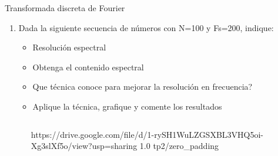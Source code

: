  \begin{frame}{Transformada discreta de Fourier}
    \begin{enumerate}
       \item{Dada la siguiente secuencia de números con N=100 y Fs=200, indique:}
    \begin{itemize}
       \item{Resolución espectral}
       \item{Obtenga el contenido espectral}
       \item{Que técnica conoce para mejorar la resolución en frecuencia?}
       \item{Aplique la técnica, grafique y comente los resultados}
    \end{itemize}

   \begin{columns}[c]
      \hspace{2pt}
      \begin{column}{.6\textwidth}
         
      \end{column}
      \hspace{2pt}
      \vrule
      \begin{column}{.4\textwidth}
         {https://drive.google.com/file/d/1-rySH1WuLZGSXBL3VHQ5oi-Xg3slXf5o/view?usp=sharing}
         {1.0}
         {tp2/zero_padding}
      \end{column}
      \hspace{2pt}
   \end{columns}
    \end{enumerate}
    \vfill
 \end{frame}
